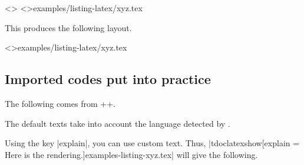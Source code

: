 \documentclass{tutodoc}
\begin{document}
\begin{tdocexa}[Customise]
    \leavevmode

    \begin{tdoclatex}<>
\tdoclatexinput[style=igor, showspaces]<>{examples/listing-latex/xyz.tex}
    \end{tdoclatex}

    This produces the following layout.

	\tdoclatexinput[style = igor, showspaces]<>{examples/listing-latex/xyz.tex}
\end{tdocexa}




\subsection{Imported codes put into practice}
\label{tutodoc-listing-latexshow}

\begin{tdocexa}[Showcase]
    The following comes from \tdoclatexin++.

    \medskip

    \begin{tdocshowcaseDOC}
    \end{tdocshowcaseDOC}
\end{tdocexa}


\begin{tdocnote}
    The default texts take into account the language detected by \thisproj.
\end{tdocnote}




\begin{tdocexa}
    Using the key \tdoclatexin|explain|, you can use custom text. Thus, \tdoclatexin|tdoclatexshow[explain = Here is the rendering.]{examples-listing-xyz.tex}| will give the following.

    \medskip

    \begin{tdocshowcaseDOC}
    \end{tdocshowcaseDOC}
\end{tdocexa}


\end{document}
